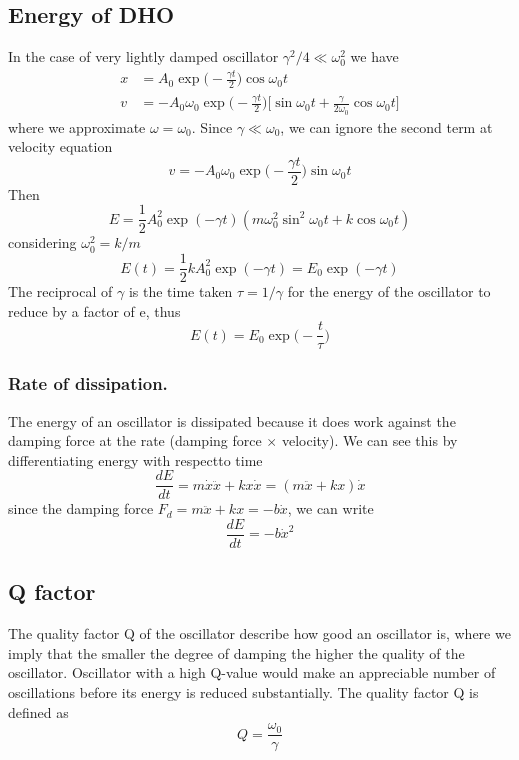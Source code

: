 \documentclass[../../../main.tex]{subfiles}
\begin{document}
\subsection{Energy of DHO}
In the case of very lightly damped oscillator $\gamma^2/4\ll \omega_0^2$ we have
\begin{align*}
    x &= A_0\exp\biggl(-\frac{\gamma t}{2}\biggr)\cos\omega_0 t\\
    v&=-A_0\omega_0\exp\biggl(-\frac{\gamma t}{2}\biggr)\biggl[\sin\omega_0t +\frac{\gamma}{2\omega_0}\cos\omega_0 t\biggr]
\end{align*}
where we approximate $\omega=\omega_0$. Since $\gamma \ll \omega_0$, we can ignore the second term at velocity equation
\begin{equation*}
    v=-A_0\omega_0\exp\biggl(-\frac{\gamma t}{2}\biggr)\sin\omega_0t 
\end{equation*}
Then
\begin{equation*}
    E=\frac{1}{2}A_0^2 \exp(-\gamma t)(m\omega_0^2\sin^2\omega_0t+k\cos\omega_0t)
\end{equation*}
considering $\omega_0^2=k/m$
\begin{equation*}
   E(t)= \frac{1}{2}kA_0^2\exp(-\gamma t) =E_0\exp(-\gamma t) 
\end{equation*}
The reciprocal of $\gamma$ is the time taken $\tau=1/\gamma$ for the energy of the oscillator to reduce by a factor of e, thus
\begin{equation*}
    E(t)=E_0\exp \biggl(-\frac{t}{\tau}\biggr)
\end{equation*}

\subsubsection{Rate of dissipation.} The energy of an oscillator is dissipated because it does work against the damping force at the rate (damping force $\times$ velocity). We can see this by differentiating energy with respectto time
\begin{equation*}
    \frac{dE}{dt}=m\dot{x}\ddot{x}+kx\dot{x}=(m\ddot{x}+kx)\dot{x}
\end{equation*}
since the damping force $F_d=m\ddot{x}+kx=-b\dot{x}$, we can write
\begin{equation*}
    \frac{dE}{dt}=-b\dot{x}^2
\end{equation*}

\subsection{Q factor}
The quality factor Q of the oscillator describe how good an oscillator is, where we imply that the smaller the degree of damping the higher the quality of the oscillator. Oscillator with a high Q-value would make an appreciable number of oscillations before its energy is reduced substantially. The quality factor Q is defined as
\begin{equation*}
    Q=\frac{\omega_0}{\gamma}
\end{equation*}
\end{document}
